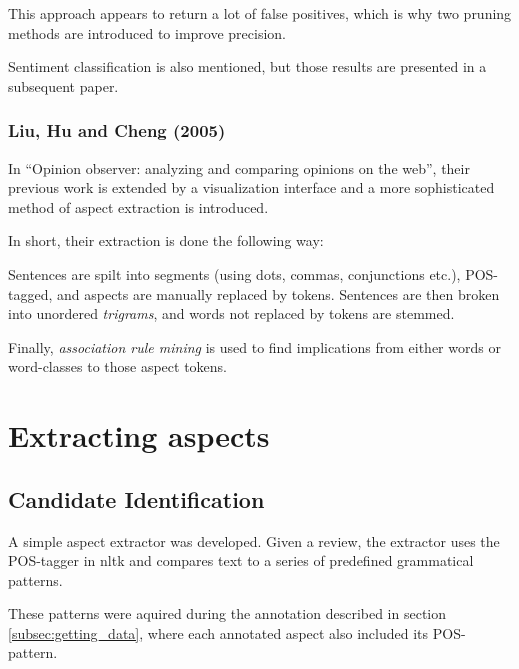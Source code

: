 \documentclass[a4paper,11pt]{kth-mag}
\begin{document}
This approach appears to return a lot of false positives, which is why two pruning
methods are introduced to improve precision.

Sentiment classification is also mentioned, but those results are presented in a subsequent paper.

\subsubsection{Liu, Hu and Cheng (2005)}
In ``Opinion observer: analyzing and comparing opinions on the web'', their previous work is extended
by a visualization interface and a more sophisticated method of aspect extraction is introduced.

In short, their extraction is done the following way:

Sentences are spilt into segments (using dots, commas, conjunctions etc.), POS-tagged, and aspects are
manually replaced by tokens. Sentences are then broken into unordered \emph{trigrams},
and words not replaced by tokens are stemmed.

Finally, \emph{association rule mining}\cite{ma1998integrating} is used to find implications
from either words or word-classes to those aspect tokens.

%


\section{Extracting aspects}
\subsection{Candidate Identification}
A simple aspect extractor was developed. Given a review, the extractor uses the
POS-tagger in nltk\cite{nltk} and compares text to a series of predefined grammatical patterns.

These patterns were aquired during the annotation described in section \ref{subsec:getting_data},
where each annotated aspect also included its POS-pattern.
\end{document}
